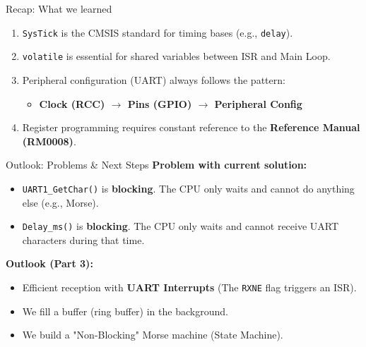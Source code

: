 \documentclass{beamer}
\begin{document}
\begin{frame}{Recap: What we learned}
	\begin{enumerate}
		\item \texttt{SysTick} is the CMSIS standard for timing bases (e.g., \texttt{delay}).
		\item \texttt{volatile} is essential for shared variables between ISR and Main Loop.
		\item Peripheral configuration (UART) always follows the pattern:
		\begin{itemize}
			\item \textbf{Clock (RCC) $\rightarrow$ Pins (GPIO) $\rightarrow$ Peripheral Config}
		\end{itemize}
		\item Register programming requires constant reference to the \textbf{Reference Manual (RM0008)}.
	\end{enumerate}
\end{frame}

\begin{frame}{Outlook: Problems \& Next Steps}
	\textbf{Problem with current solution:}
	\begin{itemize}
		\item \texttt{UART1\_GetChar()} is \textbf{blocking}. The CPU only waits and cannot do anything else (e.g., Morse).
		\item \texttt{Delay\_ms()} is \textbf{blocking}. The CPU only waits and cannot receive UART characters during that time.
	\end{itemize}
	
	\medskip
	\textbf{Outlook (Part 3):}
	\begin{itemize}
		\item Efficient reception with \textbf{UART Interrupts} (The \texttt{RXNE} flag triggers an ISR).
		\item We fill a buffer (ring buffer) in the background.
		\item We build a "Non-Blocking" Morse machine (State Machine).
	\end{itemize}
\end{frame}
\end{document}
